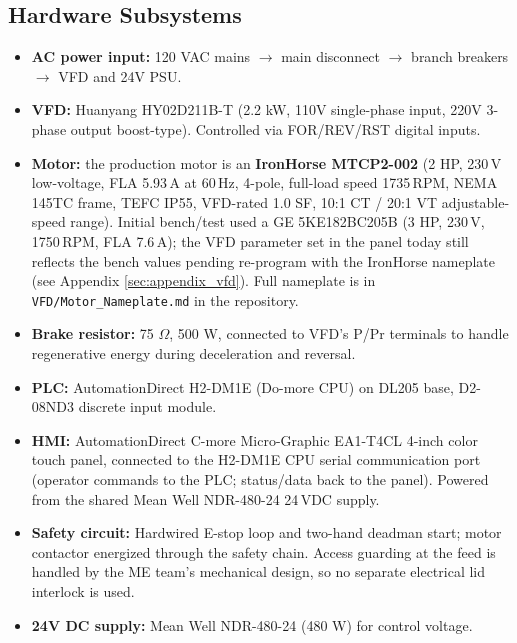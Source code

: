 \documentclass[hidelinks,12pt]{article}
\begin{document}
\subsection{Hardware Subsystems}
\begin{itemize}
    \item \textbf{AC power input:} 120 VAC mains $\rightarrow$ main disconnect $\rightarrow$ branch breakers $\rightarrow$ VFD and 24V PSU.
    \item \textbf{VFD:} Huanyang HY02D211B-T (2.2 kW, 110V single-phase input, 220V 3-phase output boost-type). Controlled via FOR/REV/RST digital inputs.
    \item \textbf{Motor:} the production motor is an \textbf{IronHorse MTCP2-002} (2 HP, 230\,V low-voltage, FLA 5.93\,A at 60\,Hz, 4-pole, full-load speed 1735\,RPM, NEMA 145TC frame, TEFC IP55, VFD-rated 1.0 SF, 10:1 CT / 20:1 VT adjustable-speed range). Initial bench/test used a GE 5KE182BC205B (3 HP, 230\,V, 1750\,RPM, FLA 7.6\,A); the VFD parameter set in the panel today still reflects the bench values pending re-program with the IronHorse nameplate (see Appendix \ref{sec:appendix_vfd}). Full nameplate is in \texttt{VFD/Motor\_Nameplate.md} in the repository.
    \item \textbf{Brake resistor:} 75 $\Omega$, 500 W, connected to VFD's P/Pr terminals to handle regenerative energy during deceleration and reversal.
    \item \textbf{PLC:} AutomationDirect H2-DM1E (Do-more CPU) on DL205 base, D2-08ND3 discrete input module.
    \item \textbf{HMI:} AutomationDirect C-more Micro-Graphic EA1-T4CL 4-inch color touch panel, connected to the H2-DM1E CPU serial communication port (operator commands to the PLC; status/data back to the panel). Powered from the shared Mean Well NDR-480-24 24\,VDC supply.
    \item \textbf{Safety circuit:} Hardwired E-stop loop and two-hand deadman start; motor contactor energized through the safety chain. Access guarding at the feed is handled by the ME team's mechanical design, so no separate electrical lid interlock is used.
    \item \textbf{24V DC supply:} Mean Well NDR-480-24 (480 W) for control voltage.
\end{itemize}
\end{document}
